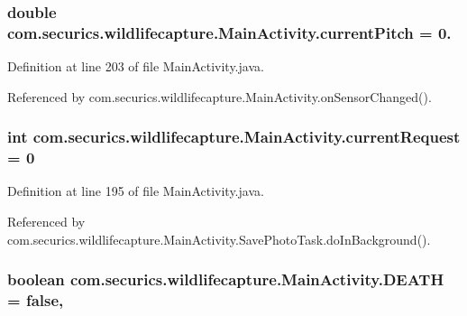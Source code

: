\subsubsection[{current\+Pitch}]{\setlength{\rightskip}{0pt plus 5cm}double com.\+securics.\+wildlifecapture.\+Main\+Activity.\+current\+Pitch = 0.\hspace{0.3cm}{\ttfamily [private]}}\label{classcom_1_1securics_1_1wildlifecapture_1_1_main_activity_a27699779f8ece25cd6cbb239edfd803f}


Definition at line 203 of file Main\+Activity.\+java.



Referenced by com.\+securics.\+wildlifecapture.\+Main\+Activity.\+on\+Sensor\+Changed().

\subsubsection[{current\+Request}]{\setlength{\rightskip}{0pt plus 5cm}int com.\+securics.\+wildlifecapture.\+Main\+Activity.\+current\+Request = 0\hspace{0.3cm}{\ttfamily [private]}}\label{classcom_1_1securics_1_1wildlifecapture_1_1_main_activity_a344c7130c86ba9ba032c15e0088726bb}


Definition at line 195 of file Main\+Activity.\+java.



Referenced by com.\+securics.\+wildlifecapture.\+Main\+Activity.\+Save\+Photo\+Task.\+do\+In\+Background().

\subsubsection[{D\+E\+A\+T\+H}]{\setlength{\rightskip}{0pt plus 5cm}boolean com.\+securics.\+wildlifecapture.\+Main\+Activity.\+D\+E\+A\+T\+H = false\hspace{0.3cm}{\ttfamily [static]}, {\ttfamily [private]}}\label{classcom_1_1securics_1_1wildlifecapture_1_1_main_activity_af5fb687b2439cd06543f099f13dbd13d}


